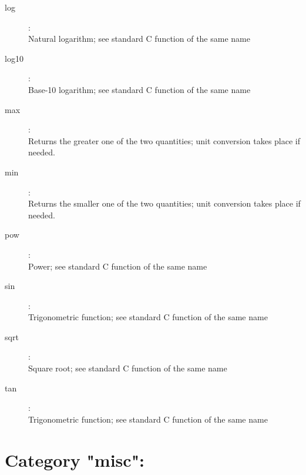\begin{description}
\item[log]:  \\
    Natural logarithm; see standard C function of the same name

\item[log10]:  \\
    Base-10 logarithm; see standard C function of the same name

\item[max]:  \\
    Returns the greater one of the two quantities; unit conversion takes place
    if needed.

\item[min]:  \\
    Returns the smaller one of the two quantities; unit conversion takes place
    if needed.

\item[pow]:  \\
    Power; see standard C function of the same name

\item[sin]:  \\
    Trigonometric function; see standard C function of the same name

\item[sqrt]:  \\
    Square root; see standard C function of the same name

\item[tan]:  \\
    Trigonometric function; see standard C function of the same name


\end{description}

\section{Category "misc":}
\label{sec:ned-functions:category-misc}

